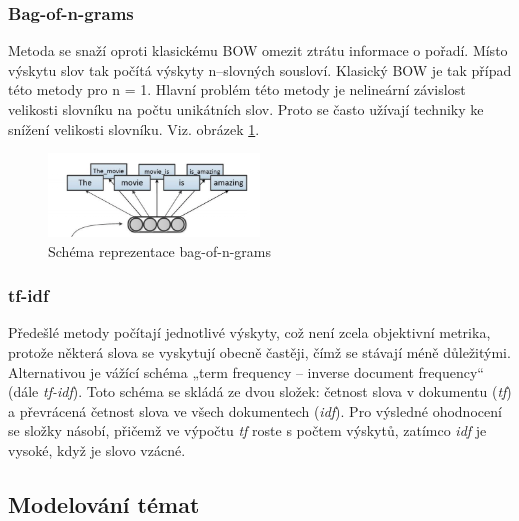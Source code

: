 \documentclass[thesis=M,czech]{FITthesis}[2019/12/23]
\begin{document}
\subsubsection{Bag-of-n-grams}
Metoda se snaží oproti klasickému BOW omezit ztrátu informace o pořadí. Místo výskytu slov tak počítá výskyty n--slovných sousloví. Klasický BOW je tak případ této metody pro n = 1. Hlavní problém této metody je nelineární závislost velikosti slovníku na počtu unikátních slov. Proto se často užívají techniky ke snížení velikosti slovníku. Viz. obrázek \ref{fig:palachy2019BONG}.
\begin{figure}\centering
	\includegraphics[width=0.5\textwidth]{images/palachy2019/palachy2019_BONG.png}
	\caption{Schéma reprezentace bag-of-n-grams\cite{palachy2019}}\label{fig:palachy2019BONG}
\end{figure}

\subsubsection{tf-idf}
Předešlé metody počítají jednotlivé výskyty, což není zcela objektivní metrika, protože některá slova se vyskytují obecně častěji, čímž se stávají méně důležitými. Alternativou je vážící schéma „term frequency – inverse document frequency“ (dále \textit{tf-idf}). Toto schéma se skládá ze dvou složek: četnost slova v dokumentu (\textit{tf}) a převrácená četnost slova ve všech dokumentech (\textit{idf}). Pro výsledné ohodnocení se složky násobí, přičemž ve výpočtu \textit{tf} roste s počtem výskytů, zatímco \textit{idf} je vysoké, když je slovo vzácné.

\subsection{Modelování témat}
\end{document}
